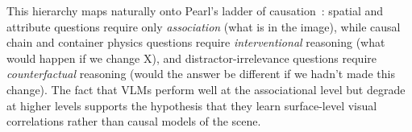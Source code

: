 This hierarchy maps naturally onto Pearl's ladder of causation~\cite{pearl2009causality}: spatial and attribute questions require only \emph{association} (what is in the image), while causal chain and container physics questions require \emph{interventional} reasoning (what would happen if we change X), and distractor-irrelevance questions require \emph{counterfactual} reasoning (would the answer be different if we hadn't made this change). The fact that VLMs perform well at the associational level but degrade at higher levels supports the hypothesis that they learn surface-level visual correlations rather than causal models of the scene.
